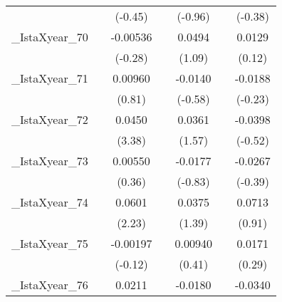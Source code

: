 {\begin{tabular}{l*{6}{c}}
            &                     &     (-0.45)         &                     &     (-0.96)         &                     &     (-0.38)         \\
[1em]
\_IstaXyear\_70&                     &    -0.00536         &                     &      0.0494         &                     &      0.0129         \\
            &                     &     (-0.28)         &                     &      (1.09)         &                     &      (0.12)         \\
[1em]
\_IstaXyear\_71&                     &     0.00960         &                     &     -0.0140         &                     &     -0.0188         \\
            &                     &      (0.81)         &                     &     (-0.58)         &                     &     (-0.23)         \\
[1em]
\_IstaXyear\_72&                     &      0.0450\sym{**} &                     &      0.0361         &                     &     -0.0398         \\
            &                     &      (3.38)         &                     &      (1.57)         &                     &     (-0.52)         \\
[1em]
\_IstaXyear\_73&                     &     0.00550         &                     &     -0.0177         &                     &     -0.0267         \\
            &                     &      (0.36)         &                     &     (-0.83)         &                     &     (-0.39)         \\
[1em]
\_IstaXyear\_74&                     &      0.0601\sym{*}  &                     &      0.0375         &                     &      0.0713         \\
            &                     &      (2.23)         &                     &      (1.39)         &                     &      (0.91)         \\
[1em]
\_IstaXyear\_75&                     &    -0.00197         &                     &     0.00940         &                     &      0.0171         \\
            &                     &     (-0.12)         &                     &      (0.41)         &                     &      (0.29)         \\
[1em]
\_IstaXyear\_76&                     &      0.0211         &                     &     -0.0180         &                     &     -0.0340         \\

\end{tabular}}
